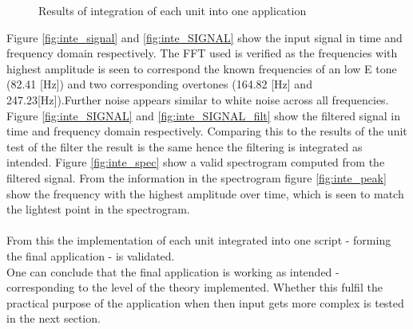 \begin{figure}[H]
\begin{subfigure}{0.49\textwidth}
\end{subfigure}
\caption{Results of integration of each unit into one application }
\label{fig:inte_validation}
\end{figure}
Figure \ref{fig:inte_signal} and \ref{fig:inte_SIGNAL} show the input signal in time and frequency domain respectively. The FFT used is verified as the frequencies with highest amplitude is seen to correspond the known frequencies of an low E tone (82.41 [Hz]) and two corresponding overtones (164.82 [Hz] and 247.23[Hz]).Further noise appears similar to white noise across all frequencies.\\
Figure \ref{fig:inte_SIGNAL} and \ref{fig:inte_SIGNAL_filt} show the filtered signal in time and frequency domain respectively. Comparing this to the results of the unit test of the filter the result is the same hence the filtering is integrated as intended. Figure \ref{fig:inte_spec} show a valid spectrogram computed from the filtered signal. From the information in the spectrogram figure \ref{fig:inte_peak} show the frequency with the highest amplitude over time, which is seen to match the lightest point in the spectrogram.\\
\\
From this the implementation of each unit integrated into one script - forming the final application - is validated. \\
One can conclude that the final application is working as intended - corresponding to the level of the theory implemented. Whether this fulfil the practical purpose of the application when then input gets more complex is tested in the next section.              